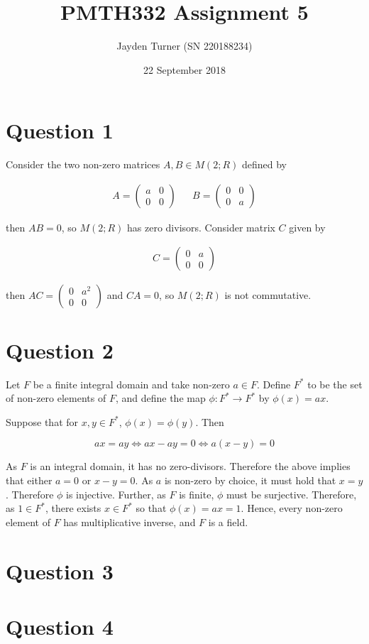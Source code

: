 \documentclass{article}
\title{PMTH332 Assignment 5}
\date{22 September 2018}
\author{Jayden Turner (SN 220188234)}
\begin{document}
\maketitle
{}

\section*{Question 1}

Consider the two non-zero matrices $A, B \in M(2; R)$ defined by

\begin{align*}
    A = \begin{pmatrix}
        a & 0\\
        0 & 0
    \end{pmatrix}
    &&
    B = \begin{pmatrix}
        0 & 0\\
        0 & a
    \end{pmatrix}
\end{align*}

then $AB = 0$, so $M(2; R)$ has zero divisors. Consider matrix $C$ given by

\begin{align*}
    C = \begin{pmatrix}
        0 & a\\
        0 & 0
    \end{pmatrix}
\end{align*}

then $AC = \begin{pmatrix}0 & a^2\\0 & 0\end{pmatrix}$ and $CA = 0$,
so $M(2; R)$ is not commutative.

\section*{Question 2}

Let $F$ be a finite integral domain and take non-zero $a \in F$. Define $F^*$
to be the set of non-zero elements of $F$, and define the map $\phi: F^* \to F^*$
by $\phi(x) = ax$.

\hfill\break
Suppose that for $x, y \in F^*$, $\phi(x) = \phi(y)$. Then

\begin{equation*}
    ax = ay \iff ax - ay = 0 \iff a(x - y) = 0
\end{equation*}

As $F$ is an integral domain, it has no zero-divisors. Therefore the above
implies that either $a = 0$ or $x - y = 0$. As $a$ is non-zero by choice,
it must hold that $x = y$. Therefore $\phi$ is injective. Further, as $F$
is finite, $\phi$ must be surjective. Therefore, as $1 \in F^*$, there
exists $x \in F^*$ so that $\phi(x) = ax = 1$. Hence, every non-zero element
of $F$ has multiplicative inverse, and $F$ is a field.

\section*{Question 3}

\section*{Question 4}
\end{document}
